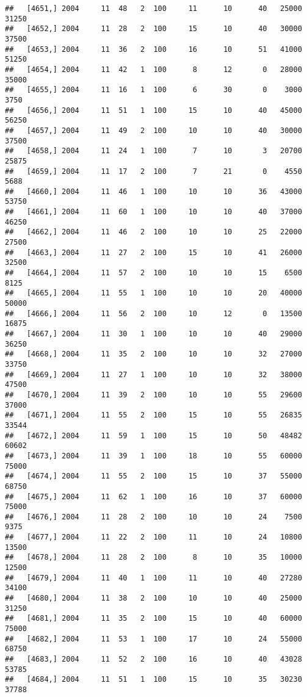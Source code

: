 \documentclass{article}\usepackage[]{graphicx}\usepackage[]{color}
\makeatletter
\newenvironment{kframe}{%
 \def\at@end@of@kframe{}%
 \ifinner\ifhmode%
  \def\at@end@of@kframe{\end{minipage}}%
  \begin{minipage}{\columnwidth}%
 \fi\fi%
 \def\FrameCommand##1{\hskip\@totalleftmargin \hskip-\fboxsep
 \colorbox{shadecolor}{##1}\hskip-\fboxsep
     \hskip-\linewidth \hskip-\@totalleftmargin \hskip\columnwidth}%
 \MakeFramed {\advance\hsize-\width
   \@totalleftmargin\z@ \linewidth\hsize
   \@setminipage}}%
 {\par\unskip\endMakeFramed%
 \at@end@of@kframe}
\newenvironment{knitrout}{}{} %
\makeatother
\begin{document}
\begin{knitrout}
\begin{kframe}
\begin{verbatim}
##   [4651,] 2004     11  48   2  100     11      10      40   25000   31250
##   [4652,] 2004     11  28   2  100     15      10      40   30000   37500
##   [4653,] 2004     11  36   2  100     16      10      51   41000   51250
##   [4654,] 2004     11  42   1  100      8      12       0   28000   35000
##   [4655,] 2004     11  16   1  100      6      30       0    3000    3750
##   [4656,] 2004     11  51   1  100     15      10      40   45000   56250
##   [4657,] 2004     11  49   2  100     10      10      40   30000   37500
##   [4658,] 2004     11  24   1  100      7      10       3   20700   25875
##   [4659,] 2004     11  17   2  100      7      21       0    4550    5688
##   [4660,] 2004     11  46   1  100     10      10      36   43000   53750
##   [4661,] 2004     11  60   1  100     10      10      40   37000   46250
##   [4662,] 2004     11  46   2  100     10      10      25   22000   27500
##   [4663,] 2004     11  27   2  100     15      10      41   26000   32500
##   [4664,] 2004     11  57   2  100     10      10      15    6500    8125
##   [4665,] 2004     11  55   1  100     10      10      20   40000   50000
##   [4666,] 2004     11  56   2  100     10      12       0   13500   16875
##   [4667,] 2004     11  30   1  100     10      10      40   29000   36250
##   [4668,] 2004     11  35   2  100     10      10      32   27000   33750
##   [4669,] 2004     11  27   1  100     10      10      32   38000   47500
##   [4670,] 2004     11  39   2  100     10      10      55   29600   37000
##   [4671,] 2004     11  55   2  100     15      10      55   26835   33544
##   [4672,] 2004     11  59   1  100     15      10      50   48482   60602
##   [4673,] 2004     11  39   1  100     18      10      55   60000   75000
##   [4674,] 2004     11  55   2  100     15      10      37   55000   68750
##   [4675,] 2004     11  62   1  100     16      10      37   60000   75000
##   [4676,] 2004     11  28   2  100     10      10      24    7500    9375
##   [4677,] 2004     11  22   2  100     11      10      24   10800   13500
##   [4678,] 2004     11  28   2  100      8      10      35   10000   12500
##   [4679,] 2004     11  40   1  100     11      10      40   27280   34100
##   [4680,] 2004     11  38   2  100     10      10      40   25000   31250
##   [4681,] 2004     11  35   2  100     15      10      40   60000   75000
##   [4682,] 2004     11  53   1  100     17      10      24   55000   68750
##   [4683,] 2004     11  52   2  100     16      10      40   43028   53785
##   [4684,] 2004     11  51   1  100     15      10      35   30230   37788

\end{verbatim}
\end{kframe}
\end{knitrout}
\end{document}
